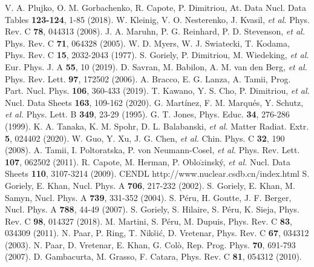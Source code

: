 \documentclass[twocolumn,showpacs,superscriptaddress,amsmath,amssymb,prc,preprintnumbers]{revtex4-1}
\begin{document}
\begin{thebibliography}{99}
 V. A. Plujko, O. M. Gorbachenko, R. Capote, P. Dimitriou, At. Data Nucl. Data Tables \textbf{123-124}, 1-85 (2018).
 W. Kleinig, V. O. Nesterenko, J. Kvasil, \emph{et al.} Phys. Rev. C \textbf{78}, 044313 (2008).
 J. A. Maruhn, P. G. Reinhard, P. D. Stevenson, \emph{et al.} Phys. Rev. C \textbf{71}, 064328 (2005).
 W. D. Myers, W. J. Swiatecki, T. Kodama, Phys. Rev. C \textbf{15}, 2032-2043 (1977).
 S. Goriely, P. Dimitriou, M. Wiedeking, \emph{et al.} Eur. Phys. J. A \textbf{55}, 10 (2019).
 D. Savran, M. Babilon, A. M. van den Berg, \emph{et al.} Phys. Rev. Lett. \textbf{97}, 172502 (2006).
 A. Bracco, E. G. Lanza, A. Tamii, Prog. Part. Nucl. Phys. \textbf{106}, 360-433 (2019).
 T. Kawano, Y. S. Cho, P. Dimitriou, \emph{et al.} Nucl. Data Sheets \textbf{163}, 109-162 (2020).
 G. Mart\'inez, F. M. Marqu\'es, Y. Schutz, \emph{et al.} Phys. Lett. B  \textbf{349}, 23-29 (1995).
 G. T. Jones, Phys. Educ. \textbf{34}, 276-286 (1999).
 K. A. Tanaka, K. M. Spohr, D. L. Balabanski, \emph{et al.} Matter Radiat. Extr. \textbf{5}, 024402 (2020).
 W. Guo, Y. Xu, J. G. Chen, \emph{et al.} Chin. Phys. C \textbf{32}, 190 (2008).
 A. Tamii, I. Poltoratska, P. von Neumann-Cosel, \emph{et al.} Phys. Rev. Lett. \textbf{107}, 062502 (2011).
 R. Capote, M. Herman, P. Oblo$\breve{z}$insk\'y, \emph{et al.} Nucl. Data Sheets \textbf{110}, 3107-3214 (2009).
 CENDL http://www.nuclear.csdb.cn/index.html
 S. Goriely, E. Khan, Nucl. Phys. A \textbf{706}, 217-232 (2002).
 S. Goriely, E. Khan, M. Samyn, Nucl. Phys. A \textbf{739}, 331-352 (2004).
 S. P\'eru, H. Goutte, J. F. Berger, Nucl. Phys. A \textbf{788}, 44-49 (2007).
 S. Goriely, S. Hilaire, S. P\'eru, K. Sieja, Phys. Rev. C \textbf{98}, 014327 (2018).
 M. Martini, S. P\'eru, M. Dupuis, Phys. Rev. C \textbf{83}, 034309 (2011).
 N. Paar, P. Ring, T. Nik\ifmmode {}\else \v{s}\fi{}i\ifmmode {}\else \'{c}\fi{}, D. Vretenar, Phys. Rev. C \textbf{67}, 034312 (2003).
 N. Paar, D. Vretenar, E. Khan, G. Col{\`{o}}, Rep. Prog. Phys. \textbf{70}, 691-793 (2007).
 D. Gambacurta, M. Grasso, F. Catara, Phys. Rev. C \textbf{81}, 054312 (2010).

\end{thebibliography}
\end{document}
